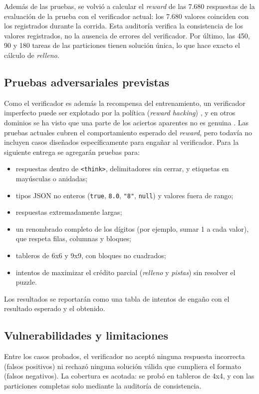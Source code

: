 Además de las pruebas, se volvió a calcular el \emph{reward} de las 7.680
respuestas de la evaluación de la prueba con el verificador actual: los 7.680 valores coinciden con los
registrados durante la corrida. Esta auditoría verifica la consistencia de los
valores registrados, no la ausencia de errores del verificador. Por último, las
450, 90 y 180 tareas de las particiones tienen solución única, lo que hace exacto el cálculo de
\emph{relleno}.

\subsection{Pruebas adversariales previstas}
Como el verificador es además la recompensa del entrenamiento, un verificador
imperfecto puede ser explotado por la política (\emph{reward hacking})
\citep{skalse2022reward}, y en otros dominios se ha visto que una parte de los
aciertos aparentes no es genuina \citep{aleithan2024swebenchplus}. Las pruebas
actuales cubren el comportamiento esperado del \emph{reward}, pero todavía no
incluyen casos diseñados específicamente para engañar al verificador. Para la
siguiente entrega se agregarán pruebas para:
\begin{itemize}
  \item respuestas dentro de \texttt{<think>}, delimitadores sin cerrar, y
  etiquetas en mayúsculas o anidadas;
  \item tipos JSON no enteros (\texttt{true}, \texttt{8.0}, \texttt{"8"},
  \texttt{null}) y valores fuera de rango;
  \item respuestas extremadamente largas;
  \item un renombrado completo de los dígitos (por ejemplo, sumar 1 a cada
  valor), que respeta filas, columnas y bloques;
  \item tableros de 6x6 y 9x9, con bloques no cuadrados;
  \item intentos de maximizar el crédito parcial (\emph{relleno} y \emph{pistas})
  sin resolver el puzzle.
\end{itemize}
Los resultados se reportarán como una tabla de intentos de engaño con el
resultado esperado y el obtenido.

\subsection{Vulnerabilidades y limitaciones}
Entre los casos probados, el verificador no aceptó ninguna respuesta incorrecta
(falsos positivos) ni rechazó ninguna solución válida que cumpliera el formato
(falsos negativos). La cobertura es acotada: se probó en tableros de 4x4, y con
las particiones completas solo mediante la auditoría de consistencia.

